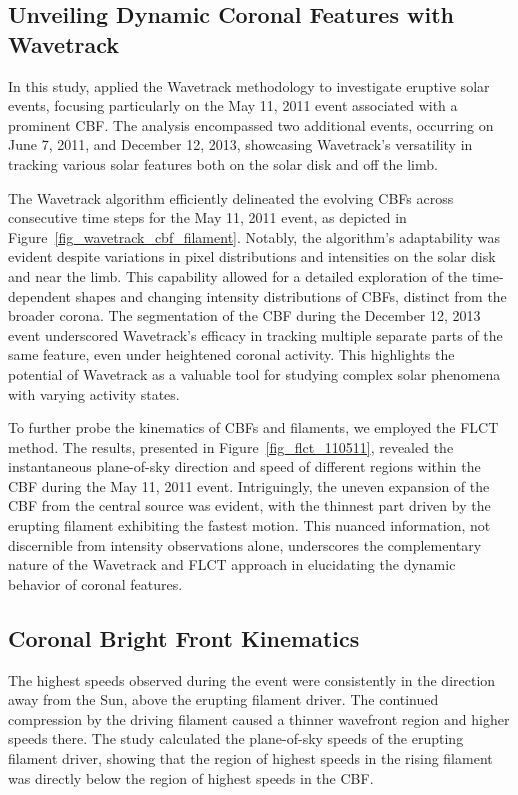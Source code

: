 \subsection{Unveiling Dynamic Coronal Features with Wavetrack}
In this study, \citet{stepanyuk_2022} applied the Wavetrack methodology to investigate eruptive solar events, focusing particularly on the May 11, 2011 event associated with a prominent CBF. The analysis encompassed two additional events, occurring on June 7, 2011, and December 12, 2013, showcasing Wavetrack's versatility in tracking various solar features both on the solar disk and off the limb.

The Wavetrack algorithm efficiently delineated the evolving CBFs across consecutive time steps for the May 11, 2011 event, as depicted in Figure~\ref{fig_wavetrack_cbf_filament}. Notably, the algorithm's adaptability was evident despite variations in pixel distributions and intensities on the solar disk and near the limb. This capability allowed for a detailed exploration of the time-dependent shapes and changing intensity distributions of CBFs, distinct from the broader corona.
The segmentation of the CBF during the December 12, 2013 event underscored Wavetrack's efficacy in tracking multiple separate parts of the same feature, even under heightened coronal activity. This highlights the potential of Wavetrack as a valuable tool for studying complex solar phenomena with varying activity states.

To further probe the kinematics of CBFs and filaments, we employed the FLCT method. The results, presented in Figure~\ref{fig_flct_110511}, revealed the instantaneous plane-of-sky direction and speed of different regions within the CBF during the May 11, 2011 event. Intriguingly, the uneven expansion of the CBF from the central source was evident, with the thinnest part driven by the erupting filament exhibiting the fastest motion. This nuanced information, not discernible from intensity observations alone, underscores the complementary nature of the Wavetrack and FLCT approach in elucidating the dynamic behavior of coronal features.

\subsection{Coronal Bright Front Kinematics}
The highest speeds observed during the event were consistently in the direction away from the Sun, above the erupting filament driver. The continued compression by the driving filament caused a thinner wavefront region and higher speeds there. The study calculated the plane-of-sky speeds of the erupting filament driver, showing that the region of highest speeds in the rising filament was directly below the region of highest speeds in the CBF.

